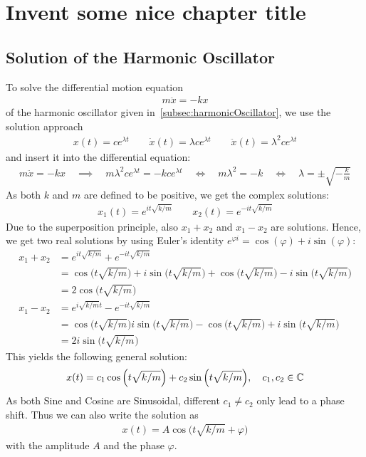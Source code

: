 \chapter{Invent some nice chapter title} 
	\section{Solution of the Harmonic Oscillator}
		\label{app:harmonicOscillatorSolution}
	
		To solve the differential motion equation
		\begin{align*}
			m\ddot{x} = -kx
		\end{align*}
		of the harmonic oscillator given in~\autoref{subsec:harmonicOscillator}, we use the solution approach
		\begin{align*}
			x(t) = c e^{\lambda t} \qquad \dot{x}(t) = \lambda c e^{\lambda t} \qquad \ddot{x}(t) = \lambda^2 c e^{\lambda t}
		\end{align*}
		and insert it into the differential equation:
		\begin{align*}
			m\ddot{x} = -kx \quad\implies\quad
			m \lambda^2 c e^{\lambda t} = -k c e^{\lambda t} \quad\iff\quad
			m \lambda^2 = -k \quad\iff\quad
			\lambda = \pm \sqrt{-\frac{k}{m}}
		\end{align*}
		As both \(k\) and \(m\) are defined to be positive, we get the complex solutions:
		\begin{align*}
			x_1(t) = e^{i t \sqrt{k / m}} \qquad x_2(t) = e^{-i t \sqrt{k / m}}
		\end{align*}
		Due to the superposition principle, also \( x_1 + x_2 \) and \( x_1 - x_2 \) are solutions. Hence, we get two real solutions by using Euler's identity \( e^{\varphi i} = \cos(\varphi) + i \sin(\varphi) \):
		\begin{align*}
			x_1 + x_2
				&= e^{i t \sqrt{k / m}} + e^{-i t \sqrt{k / m}} \\
				&= \cos\Big(t \sqrt{k / m}\Big) + i \sin\Big(t \sqrt{k / m}\Big) + \cos\Big(t \sqrt{k / m}\Big) - i \sin\Big(t \sqrt{k / m}\Big) \\
				&= 2 \cos\Big(t \sqrt{k / m}\Big) \\
			x_1 - x_2
				&= e^{i \sqrt{k / m} t} - e^{-i t \sqrt{k / m}} \\
				&= \cos\Big(t \sqrt{k / m}\Big) i \sin\Big(t \sqrt{k / m}\Big) - \cos\Big(t \sqrt{k / m}\Big) + i \sin\Big(t \sqrt{k / m}\Big) \\
				&=  2i \sin\Big(t \sqrt{k / m}\Big)
		\end{align*}
		This yields the following general solution:
		\begin{align*}
			x(t) = c_1 \cos\Big(t \sqrt{k / m}\Big) + c_2 \sin\Big(t \sqrt{k / m}\Big),\quad c_1, c_2 \in \mathbb{C}
		\end{align*}
		As both Sine and Cosine are Sinusoidal, different \( c_1 \neq c_2 \) only lead to a phase shift. Thus we can also write the solution as
		\begin{align*}
			x(t) = A \cos\Big(t \sqrt{k / m} + \varphi\Big)
		\end{align*}
		with the amplitude \(A\) and the phase \(\varphi\).
